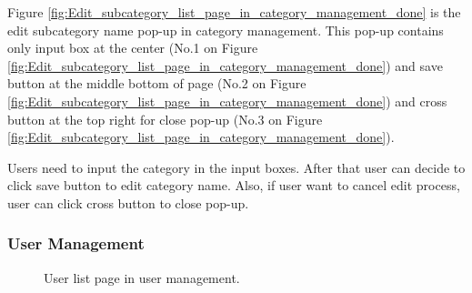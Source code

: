 \documentclass[12pt,oneside,openright,a4paper]{cpe-english-project}
\begin{document}
		\begin{flushleft}
			Figure \ref*{fig:Edit_subcategory_list_page_in_category_management_done} is the edit subcategory name pop-up in category management. This pop-up contains only input box at the center (No.1 on Figure \ref*{fig:Edit_subcategory_list_page_in_category_management_done}) and save button at the middle bottom of page (No.2 on Figure \ref*{fig:Edit_subcategory_list_page_in_category_management_done}) and cross button at the top right for close pop-up (No.3 on Figure \ref*{fig:Edit_subcategory_list_page_in_category_management_done}).
		\end{flushleft}
		\begin{flushleft}
			Users need to input the category in the input boxes. After that user can decide to click save button to edit category name. Also, if user want to cancel edit process, user can click cross button to close pop-up.
		\end{flushleft}	
\subsubsection{User Management} 
	\begin{figure}[!h]\centering
		\caption{User list page in user management.}\label{fig:ui_user_list_page_in_user_management_done}
	\end{figure}
\end{document}

